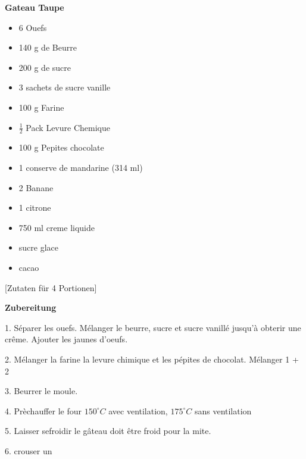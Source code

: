 

\parindent0pt	

\pagestyle{empty}


\textbf{{\LARGE Gateau Taupe}}%

\hrulefill
\vspace*{\fill}
\begin{multicols}{2}	


\begin{itemize}
\item 6 Ouefs
\item 140 g de Beurre
\item 200 g de sucre	
\item 3 sachets de sucre vanille
\item 100 g Farine
\item ${\frac{1}{2}}$ Pack Levure Chemique
\item 100 g Pepites chocolate
\item 1 conserve de mandarine (314 ml)
\item 2 Banane
\item 1 citrone
\item 750 ml creme liquide
\item sucre glace
\item cacao
\end{itemize}
\end{multicols}
\vfill									%

\vspace{2cm}
%
\begin{center}
%
[Zutaten für 4 Portionen]%
\end{center}


\vfill
\newpage
\textbf{{\LARGE Zubereitung}}%

\hrulefill

\vspace*{\fill}
\begin{multicols}{2}

1. Séparer les ouefs.
Mélanger le beurre, sucre et sucre vanillé jusqu'à obterir une crême.
Ajouter les jaunes d'oeufs.\newline

2. Mélanger la farine la levure chimique et les pépites de chocolat.
Mélanger 1 + 2\newline

3. Beurrer le moule.

4. Prèchauffer le four $150^\circ C$ avec ventilation, $175^\circ C$ sans ventilation

5. Laisser sefroidir le gâteau doit être froid pour la mite.

6. crouser un 

\end{multicols}
\vfill
